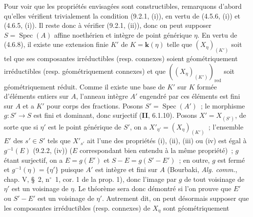 Pour voir que les propriétés envisagées sont constructibles, remarquons d'abord
qu'elles vérifient trivialement la condition (9.2.1, (i)), en vertu de
(4.5.6, (i)) et (4.6.5, (i)). Il reste donc à vérifier (9.2.1, (ii)), donc on
peut supposer $S=\operatorname{Spec}(A)$ affine noethérien et intègre de point
générique $\eta$. En vertu de (4.6.8), il existe une extension finie $K'$ de
$K=\boldsymbol{k}(\eta)$ telle que $(X_\eta)_{(K')}$ soit tel que ses
composantes irréductibles (resp. connexes) soient géométriquement irréductibles
(resp. géométriquement connexes) et que $((X_\eta)_{(K')})_{\mathrm{red}}$ soit
géométriquement réduit. Comme il existe une base de $K'$ sur $K$ formée
d'éléments entiers sur $A$, l'anneau intègre $A'$ engendré par ces éléments est
fini sur $A$ et a $K'$ pour corps des fractions. Posons
$S'=\operatorname{Spec}(A')$~; le morphisme $g:S'\to S$ est fini et dominant,
donc surjectif (\textbf{II}, 6.1.10). Posons $X'=X_{(S')}$, de sorte que si
$\eta'$ est le point générique de $S'$, on a
$X'_{\eta'}=(X_\eta)_{(K')}$~; l'ensemble $E'$ des $s'\in S'$ tels que
$X'_{s'}$ ait l'une des propriétés (i), (ii), (iii) ou (iv) est égal à
$g^{-1}(E)$ (9.2.2, (iv)) ($E$ correspondant bien entendu à la même propriété)~;
$g$ étant surjectif, on a $E=g(E')$ et $S-E=g(S'-E')$~; en outre, $g$ est fermé
et $g^{-1}(\eta)=\{\eta'\}$ puisque $A'$ est intègre et fini sur $A$ (Bourbaki,
\emph{Alg. comm.}, chap. V, \S~2, n$^\circ$~1, cor. 1 de la prop. 1), donc
l'image par $g$ de tout voisinage de $\eta'$ est un voisinage de $\eta$. Le
théorème sera donc démontré si l'on prouve que $E'$ ou $S'-E'$ est un voisinage
de $\eta'$. Autrement dit, on peut désormais supposer que les composantes
irréductibles (resp. connexes) de $X_\eta$ sont géométriquement

